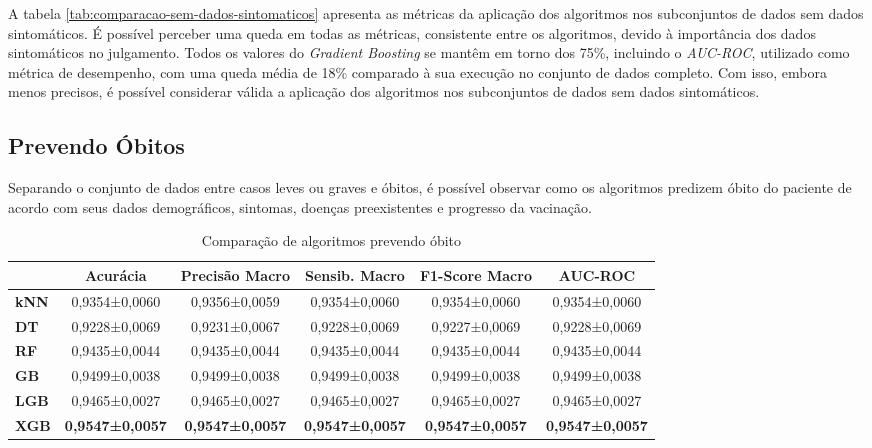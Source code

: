 A tabela \ref{tab:comparacao-sem-dados-sintomaticos} apresenta as métricas da aplicação dos algoritmos nos subconjuntos de dados sem dados sintomáticos. É possível perceber uma queda em todas as métricas, consistente entre os algoritmos, devido à importância dos dados sintomáticos no julgamento. Todos os valores do \textit{Gradient Boosting} se mantêm em torno dos 75\%, incluindo o \textit{AUC-ROC}, utilizado como métrica de desempenho, com uma queda média de 18\% comparado à sua execução no conjunto de dados completo. Com isso, embora menos precisos, é possível considerar válida a aplicação dos algoritmos nos subconjuntos de dados sem dados sintomáticos.



\subsection{Prevendo Óbitos}
\label{subsec:subconjuntos-com-morte}

Separando o conjunto de dados entre casos leves ou graves e óbitos, é possível observar como os algoritmos predizem óbito do paciente de acordo com seus dados demográficos, sintomas, doenças preexistentes e progresso da vacinação.

\begin{table}[H]
  \footnotesize
  \centering
  \begin{tabular}{l|c|c|c|c|c|}
    \cline{2-6}
    \textbf{}                          & \textbf{Acurácia}      & \textbf{Precisão Macro} & \textbf{Sensib. Macro} & \textbf{F1-Score Macro} & \textbf{AUC-ROC}       \\ \hline
    \multicolumn{1}{|l|}{\textbf{kNN}} & 0,9354±0,0060          & 0,9356±0,0059           & 0,9354±0,0060          & 0,9354±0,0060           & 0,9354±0,0060          \\ \hline
    \multicolumn{1}{|l|}{\textbf{DT}}  & 0,9228±0,0069          & 0,9231±0,0067           & 0,9228±0,0069          & 0,9227±0,0069           & 0,9228±0,0069          \\ \hline
    \multicolumn{1}{|l|}{\textbf{RF}}  & 0,9435±0,0044          & 0,9435±0,0044           & 0,9435±0,0044          & 0,9435±0,0044           & 0,9435±0,0044          \\ \hline
    \multicolumn{1}{|l|}{\textbf{GB}}  & 0,9499±0,0038          & 0,9499±0,0038           & 0,9499±0,0038          & 0,9499±0,0038           & 0,9499±0,0038          \\ \hline
    \multicolumn{1}{|l|}{\textbf{LGB}} & 0,9465±0,0027          & 0,9465±0,0027           & 0,9465±0,0027          & 0,9465±0,0027           & 0,9465±0,0027          \\ \hline
    \multicolumn{1}{|l|}{\textbf{XGB}} & \textbf{0,9547±0,0057} & \textbf{0,9547±0,0057}  & \textbf{0,9547±0,0057} & \textbf{0,9547±0,0057}  & \textbf{0,9547±0,0057} \\ \hline
    \end{tabular}
\caption{Comparação de algoritmos prevendo óbito}
\label{tab:comparacao-obito}
\end{table}


